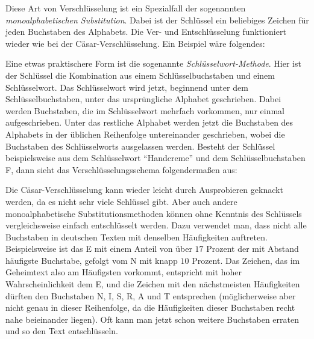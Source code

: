 \documentclass{zusammenfassung}
\begin{document}
Diese Art von Verschlüsselung ist ein Spezialfall der sogenannten \emph{monoalphabetischen Substitution}. Dabei ist der Schlüssel
ein beliebiges Zeichen für jeden Buchstaben des Alphabets. Die Ver- und Entschlüsselung funktioniert wieder wie bei der
Cäsar-Verschlüsselung. Ein Beispiel wäre folgendes:

\begin{center}
\end{center}

Eine etwas praktischere Form ist die sogenannte \emph{Schlüsselwort-Methode}. Hier ist der Schlüssel die Kombination aus einem
Schlüsselbuchstaben und einem Schlüsselwort. Das Schlüsselwort wird jetzt, beginnend unter dem Schlüsselbuchstaben, unter das
ursprüngliche Alphabet geschrieben. Dabei werden Buchstaben, die im Schlüsselwort mehrfach vorkommen, nur einmal aufgeschrieben.
Unter das restliche Alphabet werden jetzt die Buchstaben des Alphabets in der üblichen Reihenfolge untereinander geschrieben, 
wobei die Buchstaben des Schlüsselworts ausgelassen werden.
Besteht der Schlüssel beispielsweise aus dem Schlüsselwort "`Handcreme"' und dem Schlüsselbuchstaben F, dann sieht das
Verschlüsselungsschema folgendermaßen aus:

\begin{center}
  \def\secret{VWXYZHANDCREMBFGIJKLOPQSTU}
\end{center}

Die Cäsar-Verschlüsselung kann wieder leicht durch Ausprobieren geknackt werden, da es nicht sehr viele Schlüssel gibt. Aber auch
andere monoalphabetische Substitutionsmethoden können ohne Kenntnis des Schlüssels vergleichsweise einfach entschlüsselt werden.
Dazu verwendet man, dass nicht alle Buchstaben in deutschen Texten mit denselben Häufigkeiten auftreten. Beispielsweise ist das E
mit einem Anteil von über $17$ Prozent der mit Abstand häufigste Buchstabe, gefolgt vom N mit knapp $10$ Prozent. Das Zeichen, das
im Geheimtext also am Häufigsten vorkommt, entspricht mit hoher Wahrscheinlichkeit dem E, und die Zeichen mit den nächstmeisten
Häufigkeiten dürften den Buchstaben N, I, S, R, A und T entsprechen (möglicherweise aber nicht genau in dieser Reihenfolge, da die
Häufigkeiten dieser Buchstaben recht nahe beieinander liegen). Oft kann man jetzt schon weitere Buchstaben erraten und so den Text
entschlüsseln.
\end{document}

